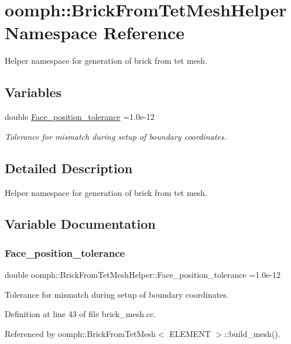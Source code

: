 \hypertarget{namespaceoomph_1_1BrickFromTetMeshHelper}{}\section{oomph\+:\+:Brick\+From\+Tet\+Mesh\+Helper Namespace Reference}
\label{namespaceoomph_1_1BrickFromTetMeshHelper}


Helper namespace for generation of brick from tet mesh.  


\subsection*{Variables}
\begin{DoxyCompactItemize}
\item 
double \hyperlink{namespaceoomph_1_1BrickFromTetMeshHelper_a335c5fdfc8d357e88d36d9f1c4be406f}{Face\+\_\+position\+\_\+tolerance} =1.\+0e-\/12
\begin{DoxyCompactList}\small\item\em Tolerance for mismatch during setup of boundary coordinates. \end{DoxyCompactList}\end{DoxyCompactItemize}


\subsection{Detailed Description}
Helper namespace for generation of brick from tet mesh. 

\subsection{Variable Documentation}
\mbox{\label{namespaceoomph_1_1BrickFromTetMeshHelper_a335c5fdfc8d357e88d36d9f1c4be406f}} 
\subsubsection{\texorpdfstring{Face\+\_\+position\+\_\+tolerance}{Face\_position\_tolerance}}
{\footnotesize\ttfamily double oomph\+::\+Brick\+From\+Tet\+Mesh\+Helper\+::\+Face\+\_\+position\+\_\+tolerance =1.\+0e-\/12}



Tolerance for mismatch during setup of boundary coordinates. 



Definition at line 43 of file brick\+\_\+mesh.\+cc.



Referenced by oomph\+::\+Brick\+From\+Tet\+Mesh$<$ E\+L\+E\+M\+E\+N\+T $>$\+::build\+\_\+mesh().

